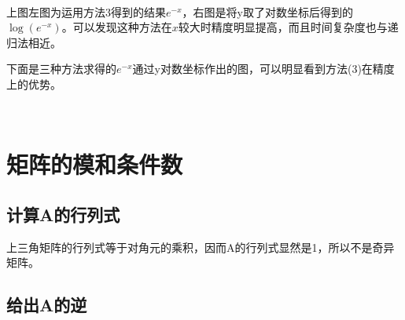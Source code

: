 \documentclass[11pt]{article}
\begin{document}
    \begin{center}
    \end{center}
    { \hspace*{\fill} \\}
    
    上图左图为运用方法3得到的结果\(e^{-x}\)，右图是将y取了对数坐标后得到的\(\log(e^{-x})\)。可以发现这种方法在\(x\)较大时精度明显提高，而且时间复杂度也与递归法相近。

下面是三种方法求得的\(e^{-x}\)通过y对数坐标作出的图，可以明显看到方法(3)在精度上的优势。



    \begin{center}
    \end{center}
    { \hspace*{\fill} \\}
    
    \section{矩阵的模和条件数}

\subsection{计算A的行列式}

上三角矩阵的行列式等于对角元的乘积，因而A的行列式显然是1，所以不是奇异矩阵。

    \subsection{给出A的逆}
\end{document}
